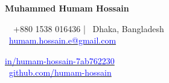 {\noindent\fontsize{24pt}{29pt}\bfseries Muhammed Humam Hossain\par}
\vspace{0.5em}
\noindent
\begin{minipage}[t]{0.50\textwidth}
    \raggedright
    \faMobile\ \ +880 1538 016436 | \faMapMarker \ Dhaka, Bangladesh \\ 
    \faEnvelope\ \href{mailto:humam.hossain.e@gmail.com}{\textcolor{blue}{humam.hossain.e@gmail.com}}
\end{minipage}%
\hfill
\begin{minipage}[t]{0.50\textwidth}
    \raggedleft
    \href{https://www.linkedin.com/in/humam-hossain-7ab762230/}{\textcolor{blue}{in/humam-hossain-7ab762230}} \faLinkedin\\\
    \href{https://github.com/humam-hossain}{\textcolor{blue}{github.com/humam-hossain}} \faGithub\
\end{minipage}

\vspace{1.2em}